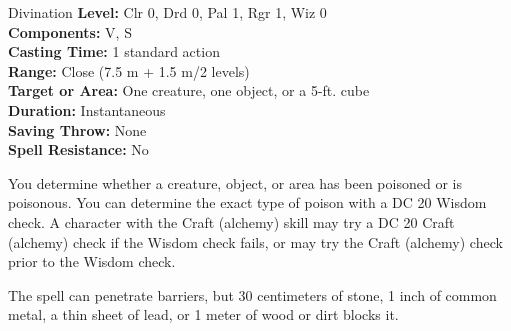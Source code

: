 {Divination}
{
	\textbf{Level:}
	Clr 0, Drd 0, Pal 1, Rgr 1, Wiz 0\\
	\textbf{Components:}
	V, S\\
	\textbf{Casting Time:}
	1 standard action\\
	\textbf{Range:}
	Close (7.5 m + 1.5 m/2 levels)\\
	\textbf{Target or Area:}
	One creature, one object, or a 5-ft. cube\\
	\textbf{Duration:}
	Instantaneous\\
	\textbf{Saving Throw:}
	None\\
	\textbf{Spell Resistance:}
	No\\
}
{
	You determine whether a creature, object, or area has been poisoned or is poisonous. You can determine the exact type of poison with a DC 20 Wisdom check. A character with the Craft (alchemy) skill may try a DC 20 Craft (alchemy) check if the Wisdom check fails, or may try the Craft (alchemy) check prior to the Wisdom check.

	The spell can penetrate barriers, but 30 centimeters of stone, 1 inch of common metal, a thin sheet of lead, or 1 meter of wood or dirt blocks it.

}
